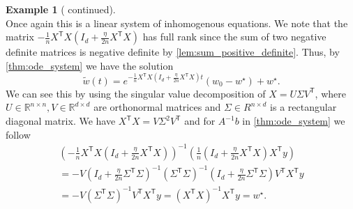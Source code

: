 \documentclass[12pt]{article}
\theoremstyle{definition}
\newtheorem{example}[example]{Example}
\numberwithin{equation}{section}
\newcommand{\R}{\mathbb{R}}
\newcommand{\T}{\mathsf{T}}
\begin{document}
\begin{example}[ continued]
\begin{equation*}
  \end{equation*}
  Once again this is a linear system of inhomogenous equations. We note that the matrix $-\frac{1}{n}X^\T X \left(I_d + \frac{\eta}{2n}X^\T X\right)$ has full rank since the sum of two negative definite matrices is negative definite by \autoref{lem:sum_positive_definite}. 
  Thus, by \autoref{thm:ode_system} we have the solution
  \begin{equation}
    \label{eq:linear_regression_second_order}
    \widetilde{w}(t) = e^{-\frac{1}{n}X^\T X \left(I_d + \frac{\eta}{2n}X^\T X\right)t}(w_0 - w^\star) + w^\star.
  \end{equation}
  We can see this by using the singular value decomposition of $X = U \Sigma V^\T$, where $U \in \R^{n \times n},V \in \R^{d \times d}$ are orthonormal matrices and $\Sigma \in R^{n \times d}$ is a rectangular diagonal matrix. We have $X^\T X = V \Sigma^2 V^\T$ and for $A^{-1}b$ in \autoref{thm:ode_system} we follow
  \begin{align*}
    \left(-\frac{1}{n}X^\T X \left(I_d + \frac{\eta}{2n}X^\T X\right)\right)^{-1}\left(\frac{1}{n}\left(I_d + \frac{\eta}{2n} X^\T X\right)X^\T y\right) \\
    =- V\left(I_d + \frac{\eta}{2n}\Sigma^\T \Sigma\right)^{-1}(\Sigma^\T \Sigma)^{-1}\left(I_d + \frac{\eta}{2n}\Sigma^\T \Sigma\right)V^\T X^\T y \\
    = -V (\Sigma^\T \Sigma)^{-1} V^\T X^\T y = (X^\T X)^{-1} X^\T y = w^\star.
  \end{align*}


\end{example}
\end{document}
